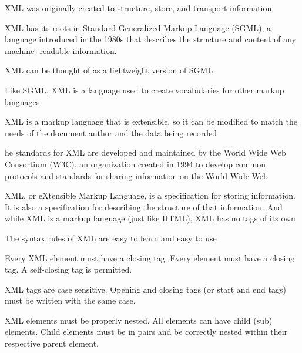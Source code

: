 


XML was originally created to structure, store, and transport information

XML has its roots in Standard Generalized Markup Language (SGML), a language
introduced in the 1980s that describes the structure and content of any machine-
readable information.

XML can be
thought of as a lightweight version of SGML

Like SGML, XML is a language used to
create vocabularies for other markup languages

XML is a markup language that is extensible, so it can be m­odified
to match the needs of the document author and the data being recorded

he ­standards
for XML are developed and maintained by the World Wide Web Consortium (W3C),
an organization created in 1994 to develop common protocols and standards for
sharing information on the World Wide Web

XML, or eXtensible Markup Language, is a
specification for storing information. It is also
a specification for describing the structure of
that information. And while XML is a markup
language (just like HTML), XML has no tags
of its own

The syntax rules of XML are easy
to learn and easy to use


Every XML element must have a closing tag. Every element must have a closing tag. A self-closing tag is
permitted.

XML tags are case sensitive. Opening and closing tags (or start and end tags) must be ­written
with the same case.

XML elements must be ­properly nested. All elements can have child (sub) elements. Child elements must
be in pairs and be correctly nested within their respective parent
element.

